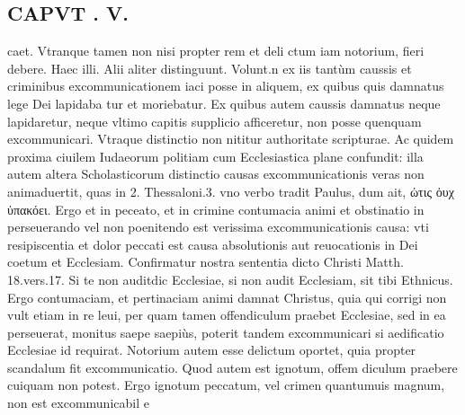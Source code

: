 \documentclass{article}
\begin{document}
\begin{pages}
\section*{CAPVT . V. }\pstart caet. Vtranque tamen non nisi propter rem et deli ctum iam notorium, fieri debere. Haec illi. Alii aliter distinguunt. Volunt.n ex iis tantùm caussis et criminibus excommunicationem iaci posse in aliquem, ex quibus quis damnatus lege Dei lapidaba tur et moriebatur. Ex quibus autem caussis damnatus neque lapidaretur, neque vltimo capitis supplicio afficeretur, non posse quenquam excommunicari. Vtraque distinctio non nititur authoritate scripturae. Ac quidem proxima ciuilem Iudaeorum politiam cum Ecclesiastica plane confundit: illa autem altera Scholasticorum distinctio causas excommunicationis veras non animaduertit, quas in 2. Thessaloni.3. vno verbo tradit Paulus, dum ait, ὠτις ὀυχ ὐπακόει. Ergo et in peceato, et in crimine contumacia animi et obstinatio in perseuerando vel non poenitendo est verissima excommunicationis causa: vti resipiscentia et dolor peccati est causa absolutionis aut reuocationis in Dei coetum et Ecclesiam. Confirmatur nostra sententia dicto Christi Matth. 18.vers.17. Si te non auditdic Ecclesiae, si non audit Ecclesiam, sit tibi Ethnicus. Ergo contumaciam, et pertinaciam animi damnat Christus, quia qui corrigi non vult etiam in re leui, per quam tamen offendiculum praebet Ecclesiae, sed in ea perseuerat, monitus saepe saepiùs, poterit tandem excommunicari si aedificatio Ecclesiae id requirat.  \pend\pstart Notorium autem esse delictum oportet, quia propter scandalum fit excommunicatio. Quod autem est ignotum, offem diculum praebere cuiquam non potest. Ergo ignotum peccatum, vel crimen quantumuis magnum, non est excommunicabil e\pend

\end{pages}
\end{document}
